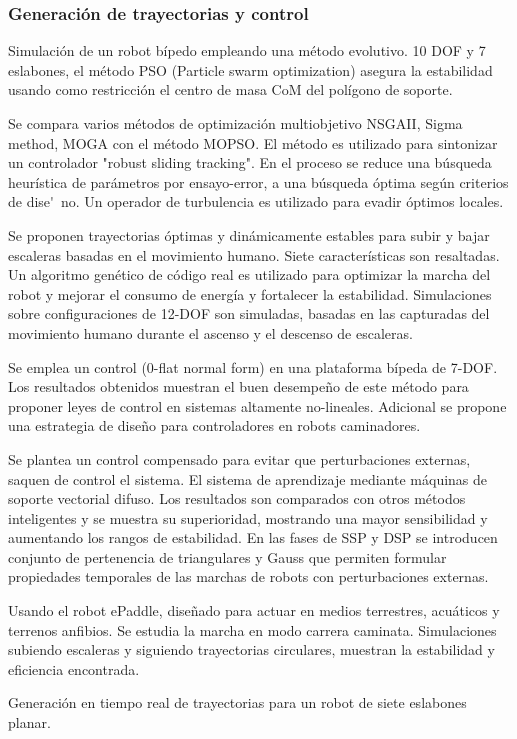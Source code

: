 {{  \subsubsection[Gen. Tray. y Control]{Generaci\'on de trayectorias y control}
  \label{sec:gentray}
  Simulaci\'on de un robot b\'ipedo empleando una m\'etodo evolutivo. 10 DOF y 7 eslabones, el m\'etodo PSO (Particle swarm optimization) asegura la estabilidad usando como restricci\'on el centro de masa CoM del pol\'igono de soporte\cite{Kherici2014}.\par
  Se compara varios m\'etodos de optimizaci\'on multiobjetivo NSGAII, Sigma method, MOGA con el m\'etodo MOPSO. El m\'etodo es utilizado para sintonizar un controlador "robust sliding tracking". En el proceso se reduce una b\'usqueda heur\'istica de parámetros por ensayo-error, a una b\'usqueda \'optima seg\'un criterios de dise\'~no. Un operador de turbulencia es utilizado para evadir \'optimos locales\cite{Mahmoodabadi2014}.\par
  Se proponen trayectorias \'optimas y din\'amicamente estables para subir y bajar escaleras basadas en el movimiento humano. Siete caracter\'isticas son resaltadas. Un algoritmo gen\'etico de c\'odigo real es utilizado para optimizar la marcha del robot y mejorar el consumo de energ\'ia y fortalecer la estabilidad. Simulaciones sobre configuraciones de 12-DOF son simuladas, basadas en las capturadas del movimiento humano durante el ascenso y el descenso de escaleras\cite{Lim2014}.\par
  Se emplea un control (0-flat normal form) en una plataforma b\'ipeda de 7-DOF. Los resultados obtenidos muestran el buen desempe\~no de este m\'etodo para proponer leyes de control en sistemas altamente no-lineales. Adicional se propone una estrategia de dise\~no para controladores en robots caminadores\cite{Bououden2014}.\par
  Se plantea un control compensado para evitar que perturbaciones externas, saquen de control el sistema. El sistema de aprendizaje mediante m\'aquinas de soporte vectorial difuso. Los resultados son comparados con otros m\'etodos inteligentes y se muestra su superioridad, mostrando una mayor sensibilidad y aumentando los rangos de estabilidad. En las fases de SSP y DSP se introducen conjunto de pertenencia de  triangulares y Gauss que permiten formular propiedades temporales de las marchas de robots con perturbaciones externas\cite{Wang2013}.\par
  Usando el robot ePaddle, dise\~nado para actuar en medios terrestres, acu\'aticos y terrenos anfibios. Se estudia la marcha en modo carrera caminata. Simulaciones subiendo escaleras y siguiendo trayectorias circulares, muestran la estabilidad y eficiencia encontrada\cite{Sun2013}.\par
  Generaci\'on en tiempo real de trayectorias para un robot de siete eslabones planar\cite{Farzaneh2014}.\par

}}
